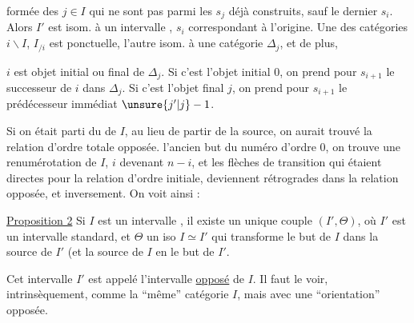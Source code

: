 
formée des $j\in I$ qui ne sont pas parmi les $s_j$ déjà construits, sauf  le dernier $s_i$.   Alors  $I'$ est isom. à un intervalle ,  $s_i$ correspondant à l'origine. Une des catégories $i\backslash I$, $I_{/i}$ est ponctuelle, l'autre  isom. à une catégorie $\mathbb{\Delta}_j$, et de plus,

$i$ est objet initial ou final de $\mathbb{\Delta}_j$. Si c'est l'objet initial $0$, on prend pour $s_{i+1}$ le successeur  de $i$ dans $\mathbb{\Delta}_j$. Si c'est l'objet final $j$, on prend pour $s_{i+1}$ le prédécesseur immédiat $\unsure{j'|j}-1$.

Si on était parti du   de $I$, au lieu de partir de la source, on aurait trouvé la relation d'ordre totale opposée.   l'ancien but du numéro d'ordre $0$, on trouve une renumérotation de $I$, $i$ devenant $n-i$, et les  flèches de transition qui étaient  directes pour la  relation d'ordre initiale, deviennent rétrogrades dans la relation   opposée, et inversement. On voit ainsi :

\uline{Proposition 2} Si $I$ est un intervalle , il existe un unique  couple $(I',\Theta)$, où $I'$ est un intervalle standard, et $\Theta$ un iso $I\simeq I'$ qui transforme le but de $I$ dans la source de $I'$ (et la source de $I$ en le but de $I'$.

Cet intervalle $I'$ est appelé l'intervalle \uline{opposé} de $I$. Il faut le voir, intrinsèquement, comme la ``même'' catégorie $I$, mais avec une ``orientation'' opposée.

